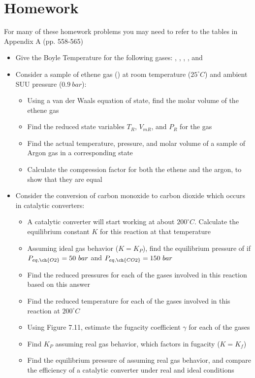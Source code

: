 \documentclass[12pt, openany, letterpaper]{memoir}
\begin{document}
\section*{Homework}
For many of these homework problems you may need to refer to the tables in Appendix A (pp. 558-565)
\begin{itemize}
	\item Give the Boyle Temperature for the following gases: , , , , and 
	\item Consider a sample of ethene gas () at room temperature ($25^\circ C$) and ambient SUU pressure ($0.9~bar$):
	\begin{itemize}
		\item Using a van der Waals equation of state, find the molar volume of the ethene gas
		\item Find the reduced state variables $T_R$, $V_{mR}$, and $P_R$ for the gas
		\item Find the actual temperature, pressure, and molar volume of a sample of Argon gas in a corresponding state
		\item Calculate the compression factor for both the ethene and the argon, to show that they are equal
	\end{itemize}
	\item Consider the conversion of carbon monoxide to carbon dioxide which occurs in catalytic converters: 
	\begin{itemize}
		\item A catalytic converter will start working at about $200^\circ C$. Calculate the equilibrium constant $K$ for this reaction at that temperature
		\item Assuming ideal gas behavior ($K=K_P$), find the equilibrium pressure of  if $P_{eq,\ch{O2}}= 50~bar$ and $P_{eq,\ch{CO2}} = 150~bar$
		\item Find the reduced pressures for each of the gases involved in this reaction based on this answer
		\item Find the reduced temperature for each of the gases involved in this reaction at $200^\circ C$
		\item Using Figure 7.11, estimate the fugacity coefficient $\gamma$ for each of the gases
		\item Find $K_P$ assuming real gas behavior, which factors in fugacity ($K=K_f$)
		\item Find the equilibrium pressure of  assuming real gas behavior, and compare the efficiency of a catalytic converter under real and ideal conditions
	\end{itemize}
\end{itemize}
\end{document}
